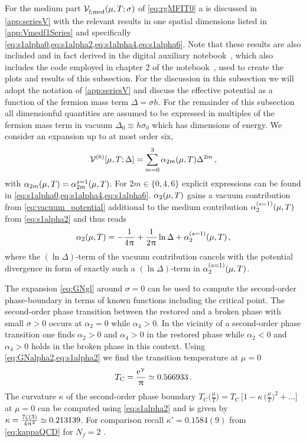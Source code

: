 For the medium part $\VeffArgs[\mathrm{f};\med]{\muT;\sigma}$ of \cref{eq:rgMFIT0} a \gla{} is discussed in \cref{app:seriesV} with the relevant results in one spatial dimensions listed in \cref{app:Vmedf1Series} and specifically \cref{eq:s1alpha0,eq:s1alpha2,eq:s1alpha4,eq:s1alpha6}.
Note that these results are also included and in fact derived in the digital auxiliary \WAM{} notebook~\cite{Steil:2023PhDThermodynamicsNB}, which also includes the code employed in chapter 2 of the \WAM{} notebook~\cite{Steil:2023GNnotebook}, used to create the plots and results of this subsection.
For the discussion in this subsection we will adopt the notation of \cref{app:seriesV} and discuss the effective potential as a function of the fermion mass term $\Delta=\sigma h$.
For the remainder of this subsection all dimensionful quantities are assumed to be expressed in multiples of the fermion mass term in vacuum $\Delta_0\equiv h \sigma_0$ which has dimensions of energy.
We consider an expansion up to at most order six, \viz{}
\begin{align}
	\VeffFArgs[][(6)]{\muT;\Delta}=\sum_{m=0}^3\alpha_{2m}(\muT)\Delta^{2m}\,,\label{eq:GNgl}
\end{align}
with $\alpha_{2m}(\muT)=\alpha_{2m}^{s=1}(\muT)$. For $2m\in\{0,4,6\}$ explicit expressions can be found in \cref{eq:s1alpha0,eq:s1alpha4,eq:s1alpha6}.
$\alpha_{2}(\muT)$ gains a vacuum contribution from \cref{eq:vacuum_potential} additional to the medium contribution $\alpha_{2}^{(s=1)}(\muT)$ from \cref{eq:s1alpha2} and thus reads
\begin{align}
\alpha_{2}(\muT) = -\frac{1}{4\piu} + \frac{1}{2\piu}\ln\Delta +\alpha_{2}^{(s=1)}(\muT)\,,
\label{eq:GNalpha2}
\end{align}
where the $(\ln\Delta)$-term of the vacuum contribution cancels with the potential \ir{} divergence \dash{} in form of exactly such a $(\ln\Delta)$-term \dash{} in $\alpha_{2}^{(s=1)}(\muT)$. 

The expansion \eqref{eq:GNgl} around $\sigma = 0$ can be used to compute the second-order phase-boundary in terms of known functions including the critical point. The second-order phase transition between the restored and a broken phase with small $\sigma > 0$ occurs at $\alpha_2 = 0$ while $\alpha_4 > 0$. In the vicinity of a second-order phase transition one finds $\alpha_2 > 0$ and $\alpha_4 > 0$ in the restored phase while $\alpha_2 < 0$ and $\alpha_4 > 0$ holds in the broken phase in this context. Using \cref{eq:GNalpha2,eq:s1alpha2} we find the transition temperature at $\mu=0$
	\begin{align}
		T_\mathrm{C} = \frac{\mathrm{e}^\upgamma}{\mkern1.0mu\uppi\mkern1.0mu} \simeq 0.566933 \, .\label{eq:Tc_MF}
	\end{align}
The curvature $\kappa$ of the second-order phase boundary $T_\mathrm{C} \big( \tfrac{\mu}{T} \big) = T_\mathrm{C} \, \big[ 1 - \kappa \, \big( \tfrac{\mu}{T} \big)^2 + \ldots \big]$ at $\mu = 0$ can be computed using \cref{eq:s1alpha2} and is given by ${\kappa=\tfrac{7\zeta(3)}{4\mkern1.0mu\uppi\mkern1.0mu^2} \simeq 0.213139}$.
For comparison recall $\kappa'=0.1584(9)$ from \cref{eq:kappaQCD} for $N_f=2$ \qcd{}.

